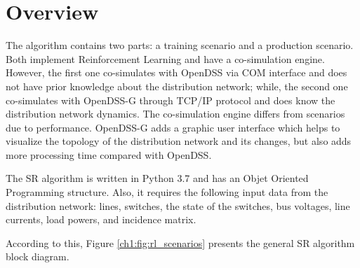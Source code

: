 \section{Overview}
\label{ch1:sec:overview}

The algorithm contains two parts:  a training scenario and a production scenario.
Both implement Reinforcement Learning and have a co-simulation engine. 
However, the first one co-simulates with OpenDSS via COM interface and does not have 
prior knowledge about the distribution network; while, the second one co-simulates 
with OpenDSS-G through TCP/IP protocol and does know the distribution network dynamics. 
The co-simulation engine differs from scenarios due to performance.
OpenDSS-G adds a graphic user interface which helps to visualize the topology of the 
distribution network and its changes, but also adds more processing time compared with OpenDSS. 

The SR algorithm is written in Python 3.7 and has an Objet Oriented Programming structure.
Also, it requires the following input data from the distribution network: lines, switches, 
the state of the switches, bus voltages, line currents, load powers, and incidence matrix. 

According to this, Figure \ref{ch1:fig:rl_scenarios} presents the general SR algorithm block diagram.

